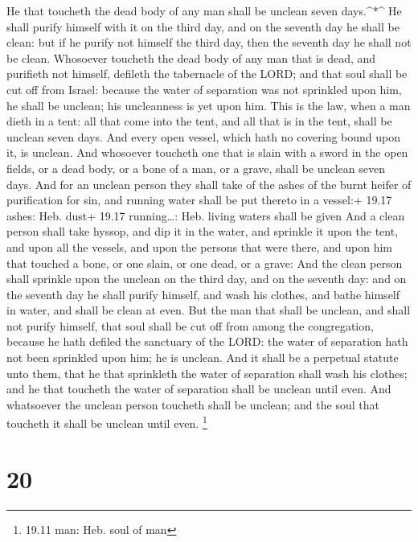  He that toucheth the dead body of any man shall be unclean
seven days.\^{}*\^{}  He shall purify himself with it on
the third day, and on the seventh day he shall be clean: but if he
purify not himself the third day, then the seventh day he shall not be
clean.  Whosoever toucheth the dead body of any man that is
dead, and purifieth not himself, defileth the tabernacle of the LORD;
and that soul shall be cut off from Israel: because the water of
separation was not sprinkled upon him, he shall be unclean; his
uncleanness is yet upon him.  This is the law, when a man
dieth in a tent: all that come into the tent, and all that is in the
tent, shall be unclean seven days.  And every open vessel,
which hath no covering bound upon it, is unclean.  And
whosoever toucheth one that is slain with a sword in the open fields, or
a dead body, or a bone of a man, or a grave, shall be unclean seven
days.  And for an unclean person they shall take of the
ashes of the burnt heifer of purification for sin, and running water
shall be put thereto in a vessel:+ 19.17 ashes: Heb. dust+ 19.17
running\ldots: Heb. living waters shall be given  And a
clean person shall take hyssop, and dip it in the water, and sprinkle it
upon the tent, and upon all the vessels, and upon the persons that were
there, and upon him that touched a bone, or one slain, or one dead, or a
grave:  And the clean person shall sprinkle upon the
unclean on the third day, and on the seventh day: and on the seventh day
he shall purify himself, and wash his clothes, and bathe himself in
water, and shall be clean at even.  But the man that shall
be unclean, and shall not purify himself, that soul shall be cut off
from among the congregation, because he hath defiled the sanctuary of
the LORD: the water of separation hath not been sprinkled upon him; he
is unclean.  And it shall be a perpetual statute unto them,
that he that sprinkleth the water of separation shall wash his clothes;
and he that toucheth the water of separation shall be unclean until
even.  And whatsoever the unclean person toucheth shall be
unclean; and the soul that toucheth it shall be unclean until even.
\footnote{19.11 man: Heb. soul of man}

\hypertarget{section-19}{%
\section{20}\label{section-19}}

